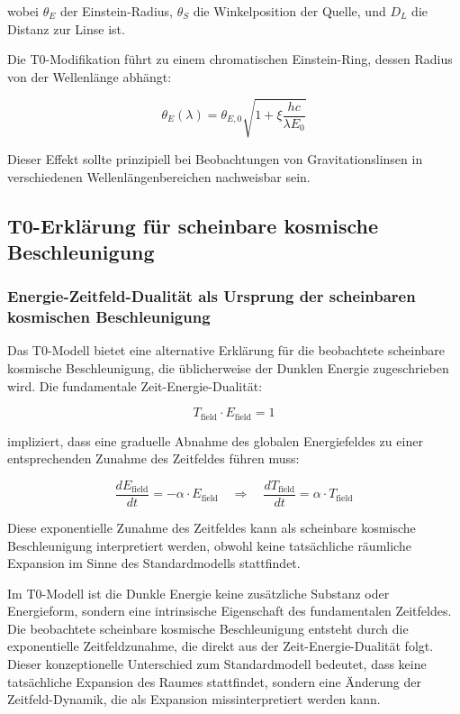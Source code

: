 \documentclass[12pt,a4paper]{article}
\theoremstyle{definition}
\begin{document}
wobei $\theta_E$ der Einstein-Radius, $\theta_S$ die Winkelposition der Quelle, und $D_L$ die Distanz zur Linse ist.

Die T0-Modifikation führt zu einem chromatischen Einstein-Ring, dessen Radius von der Wellenlänge abhängt:

\begin{equation}
\theta_E(\lambda) = \theta_{E,0} \sqrt{1 + \xi \frac{hc}{\lambda E_0}}
\end{equation}

Dieser Effekt sollte prinzipiell bei Beobachtungen von Gravitationslinsen in verschiedenen Wellenlängenbereichen nachweisbar sein.

\subsection{T0-Erklärung für scheinbare kosmische Beschleunigung}

\subsubsection{Energie-Zeitfeld-Dualität als Ursprung der scheinbaren kosmischen Beschleunigung}

Das T0-Modell bietet eine alternative Erklärung für die beobachtete scheinbare kosmische Beschleunigung, die üblicherweise der Dunklen Energie zugeschrieben wird. Die fundamentale Zeit-Energie-Dualität:

\begin{equation}
T_{\text{field}} \cdot E_{\text{field}} = 1
\end{equation}

impliziert, dass eine graduelle Abnahme des globalen Energiefeldes zu einer entsprechenden Zunahme des Zeitfeldes führen muss:

\begin{equation}
\frac{dE_{\text{field}}}{dt} = -\alpha \cdot E_{\text{field}} \quad \Rightarrow \quad \frac{dT_{\text{field}}}{dt} = \alpha \cdot T_{\text{field}}
\end{equation}

Diese exponentielle Zunahme des Zeitfeldes kann als scheinbare kosmische Beschleunigung interpretiert werden, obwohl keine tatsächliche räumliche Expansion im Sinne des Standardmodells stattfindet.

\begin{wichtig}
Im T0-Modell ist die Dunkle Energie keine zusätzliche Substanz oder Energieform, sondern eine intrinsische Eigenschaft des fundamentalen Zeitfeldes. Die beobachtete scheinbare kosmische Beschleunigung entsteht durch die exponentielle Zeitfeldzunahme, die direkt aus der Zeit-Energie-Dualität folgt. Dieser konzeptionelle Unterschied zum Standardmodell bedeutet, dass keine tatsächliche Expansion des Raumes stattfindet, sondern eine Änderung der Zeitfeld-Dynamik, die als Expansion missinterpretiert werden kann.
\end{wichtig}
\end{document}
